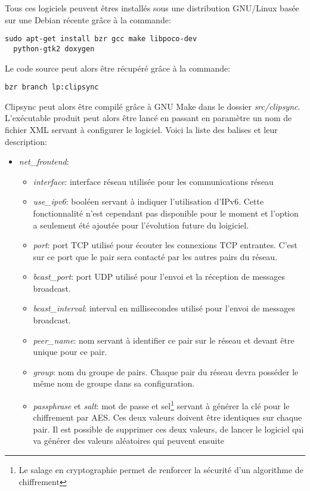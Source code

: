 Tous ces logiciels peuvent êtres installés sous une distribution GNU/Linux
basée sur une Debian récente grâce à la commande:
\begin{verbatim}
sudo apt-get install bzr gcc make libpoco-dev
  python-gtk2 doxygen
\end{verbatim}
Le code source peut alors être récupéré grâce à la commande:
\begin{verbatim}
bzr branch lp:clipsync
\end{verbatim}
Clipsync peut alors être compilé grâce à GNU Make dans le dossier
\emph{src/clipsync}.
L'exécutable produit peut alors être lancé en passant en paramètre un nom
de fichier XML servant à configurer le logiciel. Voici la liste des balises
et leur description:
\begin{itemize}
\item \emph{net\_frontend}:
  \begin{itemize}
  \item \emph{interface}: interface réseau utilisée pour les communications
    réseau
  \item \emph{use\_ipv6}: booléen servant à indiquer l'utilisation d'IPv6.
    Cette fonctionnalité n'est cependant pas disponible pour le moment et
    l'option a seulement été ajoutée pour l'évolution future du loigiciel.
  \item \emph{port}: port TCP utilisé pour écouter les connexions TCP
    entrantes. C'est sur ce port que le pair sera contacté par les autres
    pairs du réseau.
  \item \emph{bcast\_port}: port UDP utilisé pour l'envoi et la réception de
    messages broadcast.
  \item \emph{bcast\_interval}: interval en millisecondes utilisé pour l'envoi
    de messages broadcast.
  \item \emph{peer\_name}: nom servant à identifier ce pair sur le réseau et
    devant être unique pour ce pair.
  \item \emph{group}: nom du groupe de pairs. Chaque pair du réseau devra
    posséder le même nom de groupe dans sa configuration.
  \item \emph{passphrase} et \emph{salt}: mot de passe et sel\footnote{Le
      salage en cryptographie permet de renforcer la sécurité d'un algorithme
      de chiffrement\cite{schneier-crypto}} servant à générer la clé pour le
    chiffrement par AES. Ces deux valeurs doivent être identiques sur chaque
    pair. Il est possible de supprimer ces deux valeurs, de lancer le
    logiciel qui va générer des valeurs aléatoires qui peuvent ensuite

\end{itemize}
\end{itemize}
